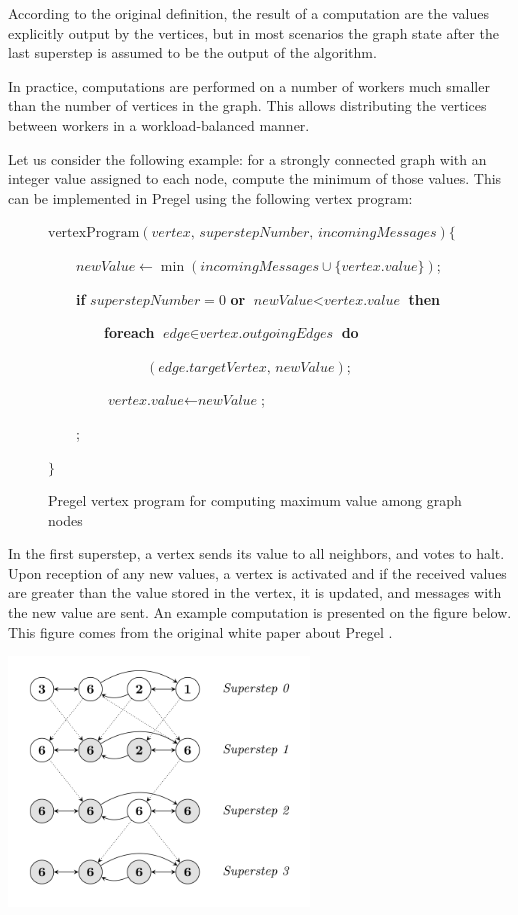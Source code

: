 According to the original definition, the result of a computation are the values explicitly output by the vertices, but in most scenarios the graph state after the last superstep is assumed to be the output of the algorithm.

In practice, computations are performed on a number of workers much smaller than the number of vertices in the graph. This allows distributing the vertices between workers in a workload-balanced manner.

Let us consider the following example: for a strongly connected graph with an integer value assigned to each node, compute the minimum of those values. This can be implemented in Pregel using the following vertex program:

\begin{figure}[h!]
\parbox{0.8\textwidth}{
$\text{vertexProgram}(\textit{vertex, superstepNumber, incomingMessages}) \{$

~~~~$\textit{newValue} \leftarrow \min(\textit{incomingMessages} \cup \{\textit{vertex.value}\})$;

~~~~\textbf{if} $superstepNumber = 0$ \textbf{or} $\textit{newValue} < \textit{vertex.value}$ \textbf{then}

~~~~~~~~\textbf{foreach} $\textit{edge} \in \textit{vertex.outgoingEdges}$ \textbf{do}

~~~~~~~~~~~~~~$(\textit{edge.targetVertex, newValue})$;

~~~~~~~~$\textit{vertex.value} \leftarrow \textit{newValue}$;

~~~~;

$\}$
}
\caption{Pregel vertex program for computing maximum value among graph nodes}
\end{figure}

In the first superstep, a vertex sends its value to all neighbors, and votes to halt. Upon reception of any new values, a vertex is activated and if the received values are greater than the value stored in the vertex, it is updated, and messages with the new value are sent. An example computation is presented on the figure below. This figure comes from the original white paper about Pregel \cite{pregel}.

\begin{center}
\includegraphics[width=0.6\textwidth]{PregelMaxVal.png}
\end{center}

